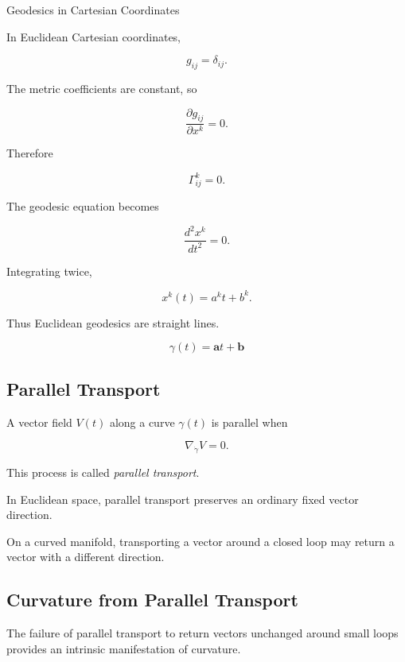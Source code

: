 \begin{workedexamplebox}{Geodesics in Cartesian Coordinates}

In Euclidean Cartesian coordinates,

\[
g_{ij}=\delta_{ij}.
\]

The metric coefficients are constant, so

\[
\frac{\partial g_{ij}}{\partial x^k}=0.
\]

Therefore

\[
\Gamma^k_{ij}=0.
\]

The geodesic equation becomes

\[
\frac{d^2x^k}{dt^2}=0.
\]

Integrating twice,

\[
x^k(t)=a^kt+b^k.
\]

Thus Euclidean geodesics are straight lines.

\begin{answerbox}
\[
\boxed{
\gamma(t)=\mathbf{a}t+\mathbf{b}
}
\]
\end{answerbox}
\end{workedexamplebox}

\subsection{Parallel Transport}
\label{subsec:parallel-transport}

A vector field \(V(t)\) along a curve \(\gamma(t)\) is parallel when

\[
\boxed{
\nabla_{\dot{\gamma}}V=0.
}
\]

This process is called \emph{parallel transport}.

In Euclidean space, parallel transport preserves an ordinary fixed vector
direction.

On a curved manifold, transporting a vector around a closed loop may return
a vector with a different direction.

\subsection{Curvature from Parallel Transport}
\label{subsec:curvature-parallel-transport}

The failure of parallel transport to return vectors unchanged around small
loops provides an intrinsic manifestation of curvature.

